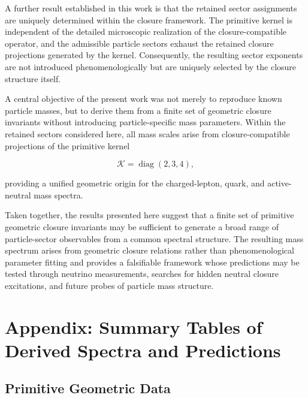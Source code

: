 \documentclass[11pt]{article}
\theoremstyle{definition}
\theoremstyle{remark}
\begin{document}
A further result established in this work is that the retained
sector assignments are uniquely determined within the closure
framework. The primitive kernel is independent of the detailed
microscopic realization of the closure-compatible operator, and
the admissible particle sectors exhaust the retained closure
projections generated by the kernel. Consequently, the resulting sector exponents are not introduced
phenomenologically but are uniquely selected by the closure
structure itself.

A central objective of the present work was not merely to
reproduce known particle masses, but to derive them from a
finite set of geometric closure invariants without introducing
particle-specific mass parameters. Within the retained sectors
considered here, all mass scales arise from closure-compatible
projections of the primitive kernel

\begin{equation}
\mathcal K
=
\operatorname{diag}(2,3,4),
\end{equation}

providing a unified geometric origin for the charged-lepton,
quark, and active-neutral mass spectra.

Taken together, the results presented here suggest that a
finite set of primitive geometric closure invariants may be
sufficient to generate a broad range of particle-sector
observables from a common spectral structure. The resulting
mass spectrum arises from geometric closure relations rather
than phenomenological parameter fitting and provides a
falsifiable framework whose predictions may be tested through
neutrino measurements, searches for hidden neutral closure
excitations, and future probes of particle mass structure.

\appendix

\appendix

\section{Appendix: Summary Tables of Derived Spectra and Predictions}
\label{app:summary_tables}

\subsection{Primitive Geometric Data}
\end{document}
